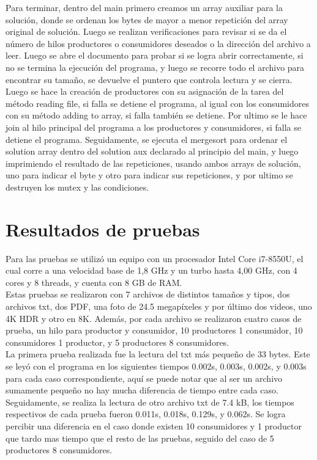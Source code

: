 \documentclass[10pt, article, natbib]{IEEEtran}
\begin{document}
Para terminar, dentro del main primero creamos un array auxiliar para la solución, donde se ordenan los bytes de mayor a menor repetición del array original de solución. Luego se realizan verificaciones para revisar si se da el número de hilos productores o consumidores deseados o la dirección del archivo a leer. Luego se abre el documento para probar si se logra abrir correctamente, si no se termina la ejecución del programa, y luego se recorre todo el archivo para encontrar su tamaño, se devuelve el puntero que controla lectura y se cierra. Luego se hace la creación de productores con su asignación de la tarea del método reading file, si falla se detiene el programa, al igual con los consumidores con su método adding to array, si falla también se detiene. Por ultimo se le hace join al hilo principal del programa a los productores y consumidores, si falla se detiene el programa.\cite{kerrisk_2010_pthread_join3} Seguidamente, se ejecuta el mergesort para ordenar el solution array dentro del solution aux declarado al principio del main, y luego imprimiendo el resultado de las repeticiones, usando ambos arrays de solución, uno para indicar el byte y otro para indicar sus repeticiones, y por ultimo se destruyen los mutex y las condiciones.\\

\section{Resultados de pruebas}
Para las pruebas se utilizó un equipo con un procesador Intel Core i7-8550U, el cual corre a una velocidad base de 1,8 GHz y un turbo hasta 4,00 GHz, con 4 cores y 8 threads, y cuenta con 8 GB de RAM.\\

Estas pruebas se realizaron con 7 archivos de distintos tamaños y tipos, dos archivos txt, dos PDF, una foto de 24.5 megapíxeles y por último dos videos, uno 4K HDR y otro en 8K. Además, por cada archivo se realizaron cuatro casos de prueba, un hilo para productor y consumidor, 10 productores 1 consumidor, 10 consumidores 1 productor, y 5 productores 8 consumidores.\\

La primera prueba realizada fue la lectura del txt más pequeño de 33 bytes. Este se leyó con el programa en los siguientes tiempos 0.002s, 0.003s, 0.002s, y 0.003s para cada caso correspondiente, aquí se puede notar que al ser un archivo sumamente pequeño no hay mucha diferencia de tiempo entre cada caso.
Seguidamente, se realiza la lectura de otro archivo txt de 7.4 kB, los tiempos respectivos de cada prueba fueron 0.011s, 0.018s, 0.129s, y 0.062s. Se logra percibir una diferencia en el caso donde existen 10 consumidores y 1 productor que tardo mas tiempo que el resto de las pruebas, seguido del caso de 5 productores 8 consumidores.\\
\end{document}
